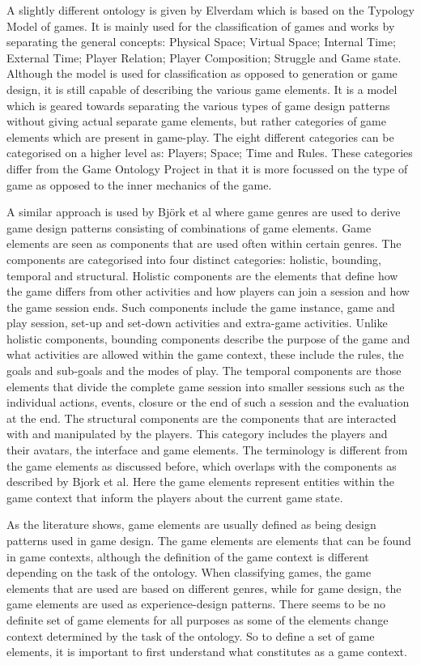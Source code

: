 \documentclass[11pt]{article}
\begin{document}
A slightly different ontology is given by Elverdam \cite{Elverdam2007} which is based on the Typology Model of games. It is mainly used for the classification of games and works by separating the general concepts: Physical Space; Virtual Space; Internal Time; External Time; Player Relation; Player Composition; Struggle and Game state. Although the model is used for classification as opposed to generation or game design, it is still capable of describing the various game elements. It is a model which is geared towards separating the various types of game design patterns without giving actual separate game elements, but rather categories of game elements which are present in game-play. The eight different categories can be categorised on a higher level as: Players; Space; Time and Rules. These categories differ from the Game Ontology Project in that it is more focussed on the type of game as opposed to the inner mechanics of the game.

A similar approach is used by Bj\"ork et al \cite{Bjork2003, Bjork2003b} where game genres are used to derive game design patterns consisting of combinations of game elements. Game elements are seen as components that are used often within certain genres. The components are categorised into four distinct categories: holistic, bounding, temporal and structural. Holistic components are the elements that define how the game differs from other activities and how players can join a session and how the game session ends. Such components include the game instance, game and play session, set-up and set-down activities and extra-game activities. Unlike holistic components, bounding components describe the purpose of the game and what activities are allowed within the game context, these include the rules, the goals and sub-goals and the modes of play. The temporal components are those elements that divide the complete game session into smaller sessions such as the individual actions, events, closure or the end of 
such a session and the evaluation at the end. The structural components are the components that are interacted with and manipulated by the players. This category includes the players and their avatars, the interface and game elements. The terminology is different from the game elements as discussed before, which overlaps with the components as described by Bjork et al. Here the game elements represent entities within the game context that inform the players about the current game state.


As the literature shows, game elements are usually defined as being design patterns used in game design. The game elements are elements that can be found in game contexts, although the definition of the game context is different depending on the task of the ontology. When classifying games, the game elements that are used are based on different genres, while for game design, the game elements are used as experience-design patterns. There seems to be no definite set of game elements for all purposes as some of the elements change context determined by the task of the ontology. So to define a set of game elements, it is important to first understand what constitutes as a game context. 
\end{document}
